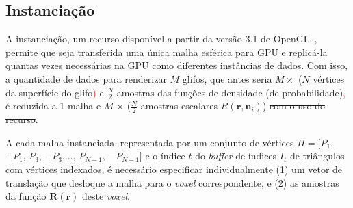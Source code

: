



\subsection{Instanciação}
\label{ssec::atributos}

A instanciação, um recurso disponível a partir da versão 3.1 de OpenGL~\cite{segal2009}, permite que seja transferida uma única malha esférica para GPU e replicá-la quantas vezes necessárias na GPU como diferentes instâncias de dados. Com isso, a quantidade de dados para renderizar $M$ glifos, que antes seria $M \times$ ($N$ vértices da superfície do glifo\textcolor{red}{)} e $\frac{N}{2}$ amostras das funções de densidade (de probabilidade)\textcolor{red}{,} é reduzida a 1 malha e $M$ $\times$ ($\frac{N}{2}$ amostras escalares $R(\mathbf{r}, \mathbf{n}_i)$)\sout{ com o uso do recurso}.%

A cada malha instanciada, representada por um conjunto de vértices $\Pi = [
  P_1$,
$-P_1$,
$ P_3$,
$-P_3$,...,
$ P_{N-1}$,
$-P_{N-1}]$ e o índice $t$ do \textit{buffer} de índices $I_t$ de triângulos com vértices indexados, é necessário especificar individualmente (1) um vetor de translação que desloque a malha para o \textit{voxel} correspondente, e (2) as amostras da função $\boldsymbol{R}(\mathbf{r})$ deste \textit{voxel}.


